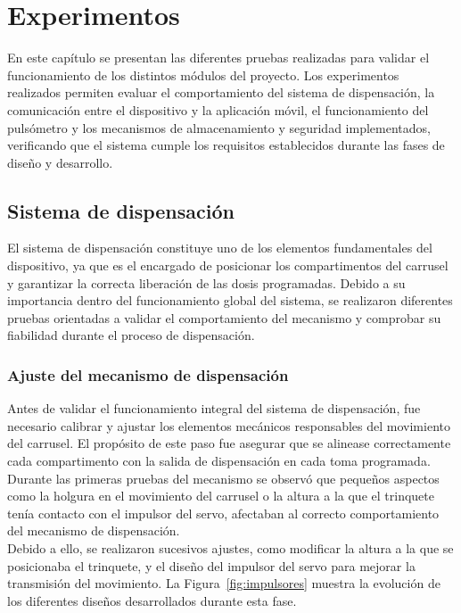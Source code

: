 \chapter{Experimentos}
\label{cap:capitulo6}

\vspace{1cm}

En este capítulo se presentan las diferentes pruebas realizadas para validar el funcionamiento de los distintos módulos del proyecto. Los experimentos realizados permiten evaluar el comportamiento del sistema de dispensación, la comunicación entre el dispositivo y la aplicación móvil, el funcionamiento del pulsómetro y los mecanismos de almacenamiento y seguridad implementados, verificando que el sistema cumple los requisitos establecidos durante las fases de diseño y desarrollo.


\section{Sistema de dispensación}

El sistema de dispensación constituye uno de los elementos fundamentales del dispositivo, ya que es el encargado de posicionar los compartimentos del carrusel y garantizar la correcta liberación de las dosis programadas. Debido a su importancia dentro del funcionamiento global del sistema, se realizaron diferentes pruebas orientadas a validar el comportamiento del mecanismo y comprobar su fiabilidad durante el proceso de dispensación.

\subsection{Ajuste del mecanismo de dispensación}

Antes de validar el funcionamiento integral del sistema de dispensación, fue necesario calibrar y ajustar los elementos mecánicos responsables del movimiento del carrusel. El propósito de este paso fue asegurar que se alinease correctamente cada compartimento con la salida de dispensación en cada toma programada.\\

Durante las primeras pruebas del mecanismo se observó que pequeños aspectos como la holgura en el movimiento del carrusel o la altura a la que el trinquete tenía contacto con el impulsor del servo, afectaban al correcto comportamiento del mecanismo de dispensación.\\

Debido a ello, se realizaron sucesivos ajustes, como modificar la altura a la que se posicionaba el trinquete, y el diseño del impulsor del servo para mejorar la transmisión del movimiento. La Figura~\ref{fig:impulsores} muestra la evolución de los diferentes diseños desarrollados durante esta fase.

